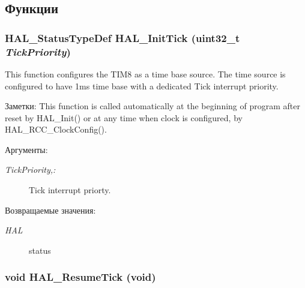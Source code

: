 \subsection{Функции}
\hypertarget{group___h_a_l___time_base_g879cdb21ef051eb81ec51c18147397d5}{
\subsubsection[{HAL\_\-InitTick}]{\setlength{\rightskip}{0pt plus 5cm}HAL\_\-StatusTypeDef HAL\_\-InitTick (uint32\_\-t {\em TickPriority})}}
\label{group___h_a_l___time_base_g879cdb21ef051eb81ec51c18147397d5}


This function configures the TIM8 as a time base source. The time source is configured to have 1ms time base with a dedicated Tick interrupt priority. 

\begin{Desc}
\item[Заметки:]This function is called automatically at the beginning of program after reset by HAL\_\-Init() or at any time when clock is configured, by HAL\_\-RCC\_\-ClockConfig(). \end{Desc}
\begin{Desc}
\item[Аргументы:]
\begin{description}
\item[{\em TickPriority,:}]Tick interrupt priorty. \end{description}
\end{Desc}
\begin{Desc}
\item[Возвращаемые значения:]
\begin{description}
\item[{\em HAL}]status \end{description}
\end{Desc}
\hypertarget{group___h_a_l___time_base_g24e0ee9dae1ec0f9d19200f5575ff790}{
\subsubsection[{HAL\_\-ResumeTick}]{\setlength{\rightskip}{0pt plus 5cm}void HAL\_\-ResumeTick (void)}}
\label{group___h_a_l___time_base_g24e0ee9dae1ec0f9d19200f5575ff790}


